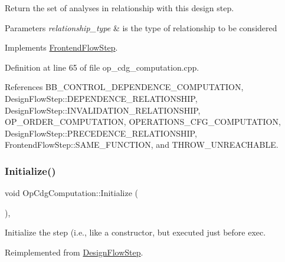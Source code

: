 Return the set of analyses in relationship with this design step. 


\begin{DoxyParams}{Parameters}
{\em relationship\+\_\+type} & is the type of relationship to be considered \\
\hline
\end{DoxyParams}


Implements \hyperlink{classFrontendFlowStep_abeaff70b59734e462d347ed343dd700d}{Frontend\+Flow\+Step}.



Definition at line 65 of file op\+\_\+cdg\+\_\+computation.\+cpp.



References B\+B\+\_\+\+C\+O\+N\+T\+R\+O\+L\+\_\+\+D\+E\+P\+E\+N\+D\+E\+N\+C\+E\+\_\+\+C\+O\+M\+P\+U\+T\+A\+T\+I\+ON, Design\+Flow\+Step\+::\+D\+E\+P\+E\+N\+D\+E\+N\+C\+E\+\_\+\+R\+E\+L\+A\+T\+I\+O\+N\+S\+H\+IP, Design\+Flow\+Step\+::\+I\+N\+V\+A\+L\+I\+D\+A\+T\+I\+O\+N\+\_\+\+R\+E\+L\+A\+T\+I\+O\+N\+S\+H\+IP, O\+P\+\_\+\+O\+R\+D\+E\+R\+\_\+\+C\+O\+M\+P\+U\+T\+A\+T\+I\+ON, O\+P\+E\+R\+A\+T\+I\+O\+N\+S\+\_\+\+C\+F\+G\+\_\+\+C\+O\+M\+P\+U\+T\+A\+T\+I\+ON, Design\+Flow\+Step\+::\+P\+R\+E\+C\+E\+D\+E\+N\+C\+E\+\_\+\+R\+E\+L\+A\+T\+I\+O\+N\+S\+H\+IP, Frontend\+Flow\+Step\+::\+S\+A\+M\+E\+\_\+\+F\+U\+N\+C\+T\+I\+ON, and T\+H\+R\+O\+W\+\_\+\+U\+N\+R\+E\+A\+C\+H\+A\+B\+LE.

\mbox{\label{classOpCdgComputation_a38c20d73f1e6af5b403e06affe59a30a}} 
\subsubsection{\texorpdfstring{Initialize()}{Initialize()}}
{\footnotesize\ttfamily void Op\+Cdg\+Computation\+::\+Initialize (\begin{DoxyParamCaption}{ }\end{DoxyParamCaption})\hspace{0.3cm}{\ttfamily [override]}, {\ttfamily [virtual]}}



Initialize the step (i.\+e., like a constructor, but executed just before exec. 



Reimplemented from \hyperlink{classDesignFlowStep_a44b50683382a094976e1d432a7784799}{Design\+Flow\+Step}.



